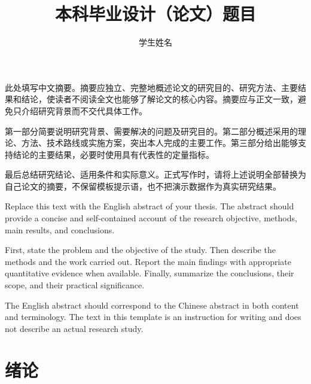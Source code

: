 \documentclass[bachelor]{njupthesis}
\title{本科毕业设计（论文）题目}
\author{学生姓名}
\begin{document}
\hypersetup{pageanchor=false}
\makecover %

\begin{chineseabstract}
此处填写中文摘要。摘要应独立、完整地概述论文的研究目的、研究方法、主要结果和结论，使读者不阅读全文也能够了解论文的核心内容。摘要应与正文一致，避免只介绍研究背景而不交代具体工作。

第一部分简要说明研究背景、需要解决的问题及研究目的。第二部分概述采用的理论、方法、技术路线或实施方案，突出本人完成的主要工作。第三部分给出能够支持结论的主要结果，必要时使用具有代表性的定量指标。

最后总结研究结论、适用条件和实际意义。正式写作时，请将上述说明全部替换为自己论文的摘要，不保留模板提示语，也不把演示数据作为真实研究结果。

\end{chineseabstract}

\begin{englishabstract}
Replace this text with the English abstract of your thesis. The abstract should provide a concise and self-contained account of the research objective, methods, main results, and conclusions.

First, state the problem and the objective of the study. Then describe the methods and the work carried out. Report the main findings with appropriate quantitative evidence when available. Finally, summarize the conclusions, their scope, and their practical significance.

The English abstract should correspond to the Chinese abstract in both content and terminology. The text in this template is an instruction for writing and does not describe an actual research study.

\end{englishabstract}

\thesistableofcontents %
\thesischapterexordium %
\hypersetup{pageanchor=true}

\chapter{绪论}
\label{chap:introduction}
\end{document}
